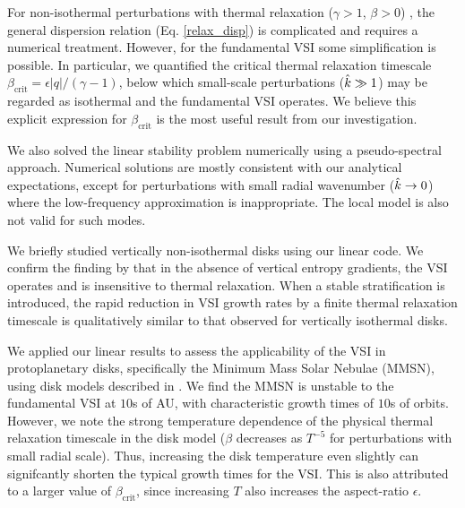 
For non-isothermal  perturbations with thermal relaxation ($\gamma>1$,
$\beta>0$) , the general dispersion relation (Eq. \ref{relax_disp}) is
complicated and requires a numerical treatment. However, for the
fundamental VSI some simplification is  possible. In particular, we quantified the critical thermal relaxation
timescale $\beta_\mathrm{crit}=\epsilon|q|/(\gamma-1)$, below
which small-scale perturbations ($\hat{k}\gg 1$) may be regarded as isothermal
and the fundamental VSI operates. We believe this explicit expression for
$\beta_\mathrm{crit}$ is the most useful result from our
investigation. 

We also solved the linear stability problem numerically using a
pseudo-spectral approach. Numerical solutions are mostly consistent
with our analytical expectations, except for perturbations with small
radial wavenumber ($\hat{k}\to0$) where the low-frequency approximation
is inappropriate. The local model is also not valid for such modes.  


We briefly studied vertically non-isothermal disks using our linear 
code. We confirm the finding by \cite{nelson13} that in the absence
of vertical entropy gradients, the VSI operates and is insensitive to
thermal relaxation. When a stable stratification is introduced, the
rapid reduction in VSI growth rates by a finite thermal relaxation timescale
is qualitatively similar to that observed for vertically isothermal
disks.  


We applied our linear results to assess the applicability of the VSI in
protoplanetary disks, specifically the Minimum Mass Solar Nebulae (MMSN),
using disk models described in \cite{chiang10}. We find the MMSN is
unstable to the fundamental VSI at $10$s of AU, with characteristic
growth times of $10$s of orbits. However, we note the strong
temperature dependence of the physical thermal relaxation timescale
in the disk model ($\beta$ decreases as $T^{-5}$ for perturbations with small
radial scale). Thus, increasing the disk temperature even slightly can signifcantly 
shorten the typical growth times for the VSI. This is also attributed
to a larger value of $\beta_\mathrm{crit}$, since increasing $T$ also
increases the aspect-ratio $\epsilon$. 


